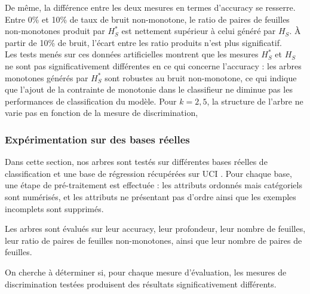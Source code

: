 \documentclass[a4paper]{article}
\begin{document}
De même, la différence entre les deux mesures en termes d'accuracy se resserre.
Entre 0\% et 10\% de taux de bruit non-monotone, le ratio de paires de feuilles
non-monotones produit par $H^*_S$ est nettement supérieur à celui généré par
$H_S$. À partir de 10\% de bruit, l'écart entre les ratio produits n'est plus
significatif. \\

Les tests menés sur ces données artificielles montrent que les mesures $H^*_S$
et $H_S$ ne sont pas significativement différentes en ce qui concerne l'accuracy
: les arbres monotones générés par $H^*_S$ sont robustes au bruit non-monotone,
ce qui indique que l'ajout de la contrainte de monotonie dans le classifieur ne
diminue pas les performances de classification du modèle. Pour $k=2,5$, la
structure de l'arbre ne varie pas en fonction de la mesure de discrimination, 

\subsubsection{Expérimentation sur des bases réelles}

Dans cette section, nos arbres sont testés sur différentes bases réelles de
classification et une base de régression récupérées sur UCI \cite{uci}. Pour
chaque base, une étape de pré-traitement est effectuée : les attributs ordonnés
mais catégoriels sont numérisés, et les attributs ne présentant pas d'ordre
ainsi que les exemples incomplets sont supprimés.

Les arbres sont évalués sur leur accuracy, leur profondeur, leur nombre de
feuilles, leur ratio de paires de feuilles non-monotones, ainsi que leur nombre
de paires de feuilles.

On cherche à déterminer si, pour chaque mesure d'évaluation, les mesures de
discrimination testées produisent des résultats significativement différents. \\

\begin{table}
\caption{Description des bases de classification}
\label{tab:descr-classification}
\end{table}
\end{document}
